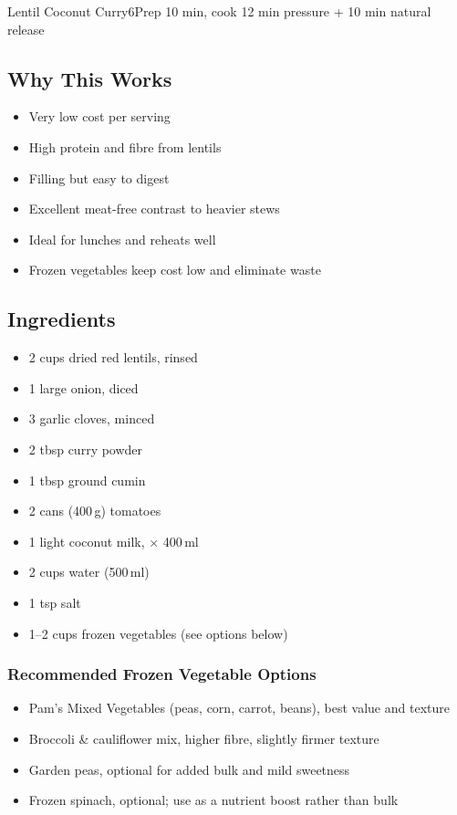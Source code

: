 \begin{recipebox}{Lentil Coconut Curry}{6}{Prep 10 min, cook 12 min pressure + 10 min natural release}
\subsection*{Why This Works}
\begin{itemize}
    \item Very low cost per serving
    \item High protein and fibre from lentils
    \item Filling but easy to digest
    \item Excellent meat-free contrast to heavier stews
    \item Ideal for lunches and reheats well
    \item Frozen vegetables keep cost low and eliminate waste
\end{itemize}

\subsection*{Ingredients}
\begin{itemize}
    \item 2 cups dried red lentils, rinsed
    \item 1 large onion, diced
    \item 3 garlic cloves, minced
    \item 2 tbsp curry powder
    \item 1 tbsp ground cumin
    \item 2 cans (400\,g) tomatoes
    \item 1 light coconut milk, $\times$ 400\,ml
    \item 2 cups water (500\,ml)
    \item 1 tsp salt
    \item 1--2 cups frozen vegetables (see options below)
\end{itemize}

\subsubsection*{Recommended Frozen Vegetable Options}
\begin{itemize}
    \item Pam's Mixed Vegetables (peas, corn, carrot, beans), best value and texture
    \item Broccoli \& cauliflower mix, higher fibre, slightly firmer texture
    \item Garden peas, optional for added bulk and mild sweetness
    \item Frozen spinach, optional; use as a nutrient boost rather than bulk
\end{itemize}


\end{recipebox}
